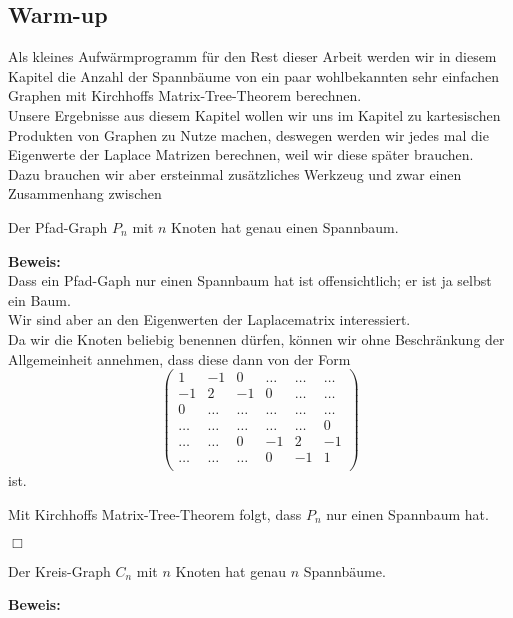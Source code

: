 \subsection{Warm-up}
Als kleines Aufwärmprogramm für den Rest dieser Arbeit werden wir in diesem Kapitel die Anzahl der Spannbäume von ein paar wohlbekannten sehr einfachen Graphen mit Kirchhoffs Matrix-Tree-Theorem berechnen.\\
Unsere Ergebnisse aus diesem Kapitel wollen wir uns im Kapitel zu kartesischen Produkten von Graphen zu Nutze machen, deswegen werden wir jedes mal die Eigenwerte der Laplace Matrizen berechnen, weil wir diese später brauchen.\\
Dazu brauchen wir aber ersteinmal zusätzliches Werkzeug und zwar einen Zusammenhang zwischen 
\begin{Lms}
 Der Pfad-Graph $P_n$ mit $n$ Knoten hat genau einen Spannbaum.
\end{Lms}
\textbf{Beweis:}\\
Dass ein Pfad-Gaph nur einen Spannbaum hat ist offensichtlich; er ist ja selbst ein Baum.\\
Wir sind aber an den Eigenwerten der Laplacematrix interessiert.\\
Da wir die Knoten beliebig benennen dürfen, können wir ohne Beschränkung der Allgemeinheit annehmen, dass diese dann von der Form
\begin{equation}
\begin{pmatrix}
1&-1&0&\ldots&\ldots&\ldots\\
-1&2&-1&0&\ldots&\ldots\\
0&\ldots&\ldots&\ldots&\ldots&\ldots\\
\ldots&\ldots&\ldots&\ldots&\ldots&0\\
\ldots&\ldots&0&-1&2&-1\\
\ldots&\ldots&\ldots&0&-1&1\\
\end{pmatrix}
\end{equation}
ist.

Mit Kirchhoffs Matrix-Tree-Theorem folgt, dass $P_n$ nur einen Spannbaum hat.
\begin{flushright} $\Box$ \end{flushright} 
\begin{Lms}
 Der Kreis-Graph $C_n$ mit $n$ Knoten hat genau $n$ Spannbäume.
\end{Lms}
\textbf{Beweis:}\\
